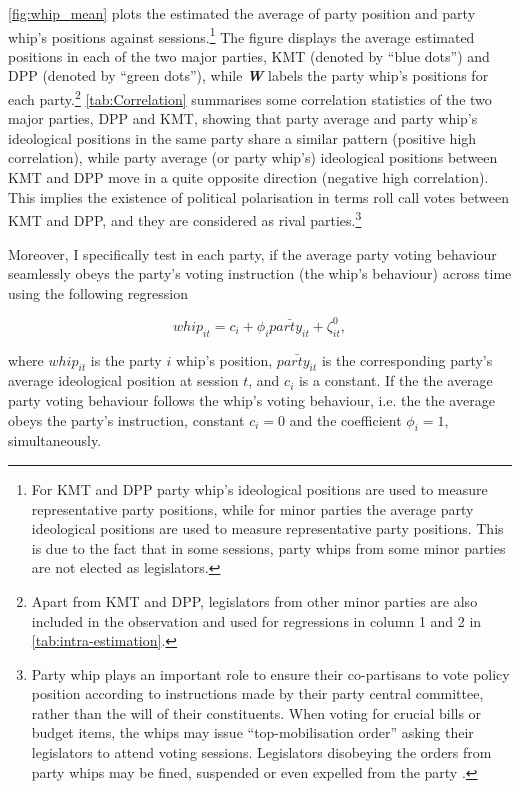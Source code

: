 \autoref{fig:whip_mean} plots the estimated the average of party position and party whip's positions against sessions.\footnote{For KMT and DPP party whip's ideological positions are used to measure representative party positions, while for minor parties the average party ideological positions are used to measure representative party positions. This is due to the fact that in some sessions, party whips from some minor parties are not elected as legislators.} The figure displays the average estimated positions in each of the two major parties, KMT (denoted by ``blue dots'') and DPP (denoted by ``green dots''), while \textbf{\textit{W}} labels the party whip's positions for each party.\footnote{Apart from KMT and DPP, legislators from other minor parties are also included in the observation and used for regressions in column 1 and 2 in \autoref{tab:intra-estimation}.} \autoref{tab:Correlation} summarises some correlation statistics of the two major parties, DPP and KMT, showing that party average and party whip's ideological positions in the same party share a similar pattern (positive high correlation), while party average (or party whip's) ideological positions between KMT and DPP move in a quite opposite direction (negative high correlation). This implies the existence of political polarisation in terms roll call votes between KMT and DPP, and they are considered as rival parties.\footnote{Party whip plays an important role to ensure their co-partisans to vote policy position according to instructions made by their party central committee, rather than the will of their constituents. When voting for crucial bills or budget items, the whips may issue ``top-mobilisation order'' asking their legislators to attend voting sessions. Legislators disobeying the orders from party whips may be fined, suspended or even expelled from the party \citep{Hsu2002}.} 

Moreover, I specifically test in each party, if the average party voting behaviour seamlessly obeys the party's voting instruction (the whip's behaviour) across time using the following regression

\begin{equation}
whip_{it}=c_{i}+\phi_{i}\bar{party_{it}}+\zeta_{it}^{0},
\end{equation}

\noindent where $whip_{it}$ is the party $i$ whip's position, $\bar{party_{it}}$ is the corresponding party's average ideological position at session $t$, and $c_{i}$ is a constant. If the the average party voting behaviour follows the whip's voting behaviour, i.e. the the average obeys the party's instruction, constant $c_{i}=0$ and the coefficient $\phi_{i}=1$, simultaneously.

